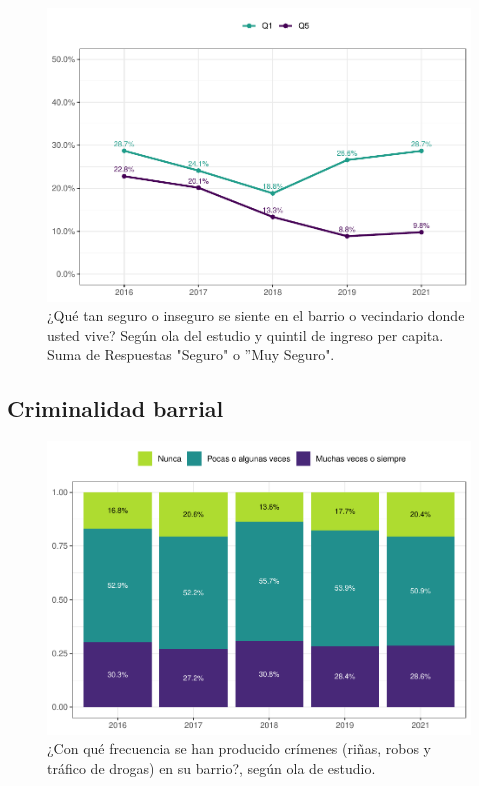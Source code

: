 \documentclass[
  12pt,
]{book}
\begin{document}
\begin{figure}

{\centering \includegraphics{reporte-elsoc_files/figure-latex/seguri-quintil-1} 

}

\caption{¿Qué tan seguro o inseguro se siente en el barrio o vecindario donde usted vive? Según ola del estudio y quintil de ingreso per capita. Suma de Respuestas "Seguro" o ”Muy Seguro".}\label{fig:seguri-quintil}
\end{figure}

\hypertarget{criminalidad-barrial}{%
\subsection{Criminalidad barrial}\label{criminalidad-barrial}}

\begin{figure}

{\centering \includegraphics{reporte-elsoc_files/figure-latex/crim-olas-1} 

}

\caption{¿Con qué frecuencia se han producido crímenes (riñas, robos y tráfico de drogas) en su barrio?, según ola de estudio.}\label{fig:crim-olas}
\end{figure}
\end{document}
